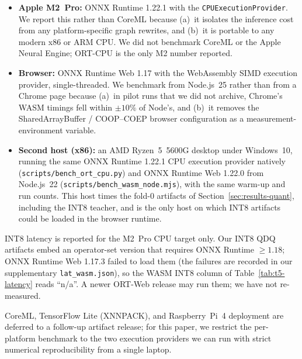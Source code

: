 \begin{itemize}
\item \textbf{Apple M2~Pro:} ONNX Runtime 1.22.1 with the \texttt{CPUExecutionProvider}. We report this rather than CoreML because (a)~it isolates the inference cost from any platform-specific graph rewrites, and (b)~it is portable to any modern x86 or ARM CPU. We did not benchmark CoreML or the Apple Neural Engine; ORT-CPU is the only M2 number reported.
\item \textbf{Browser:} ONNX Runtime Web 1.17 with the WebAssembly SIMD execution provider, single-threaded. We benchmark from Node.js~25 rather than from a Chrome page because (a)~in pilot runs that we did not archive, Chrome's WASM timings fell within $\pm 10\%$ of Node's, and (b)~it removes the SharedArrayBuffer / COOP--COEP browser configuration as a measurement-environment variable.
\item \textbf{Second host (x86):} an AMD Ryzen~5~5600G desktop under Windows~10, running the same ONNX Runtime 1.22.1 CPU execution provider natively (\texttt{scripts/bench\_ort\_cpu.py}) and ONNX Runtime Web 1.22.0 from Node.js~22 (\texttt{scripts/bench\_wasm\_node.mjs}), with the same warm-up and run counts. This host times the fold-0 artifacts of Section~\ref{sec:results-quant}, including the INT8 teacher, and is the only host on which INT8 artifacts could be loaded in the browser runtime.
\end{itemize}

INT8 latency is reported for the M2~Pro CPU target only. Our INT8 QDQ artifacts embed an operator-set version that requires ONNX Runtime $\geq 1.18$; ONNX Runtime Web 1.17.3 failed to load them (the failures are recorded in our supplementary \texttt{lat\_wasm.json}), so the WASM INT8 column of Table~\ref{tab:t5-latency} reads ``n/a''. A newer ORT-Web release may run them; we have not re-measured.

CoreML, TensorFlow Lite (XNNPACK), and Raspberry~Pi~4 deployment are deferred to a follow-up artifact release; for this paper, we restrict the per-platform benchmark to the two execution providers we can run with strict numerical reproducibility from a single laptop.
